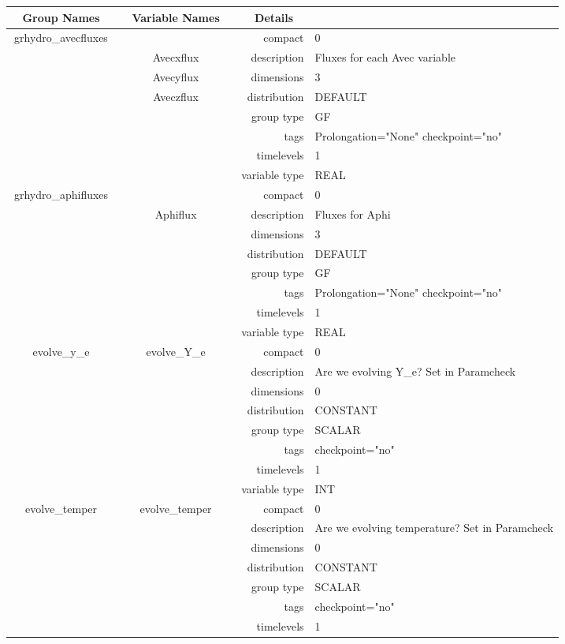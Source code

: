 \begin{tabular*}{150mm}{|c|c@{\extracolsep{\fill}}|rl|} \hline 
~ {\bf Group Names} ~ & ~ {\bf Variable Names} ~  &{\bf Details} ~ & ~ \\ 
\hline 
grhydro\_avecfluxes &  & compact & 0 \\ 
 & Avecxflux & description & Fluxes for each Avec variable \\ 
 & Avecyflux & dimensions & 3 \\ 
 & Aveczflux & distribution & DEFAULT \\ 
 &  & group type & GF \\ 
 &  & tags & Prolongation="None" checkpoint="no" \\ 
 &  & timelevels & 1 \\ 
 &  & variable type & REAL \\ 
\hline 
grhydro\_aphifluxes &  & compact & 0 \\ 
 & Aphiflux & description & Fluxes for Aphi \\ 
 &  & dimensions & 3 \\ 
 &  & distribution & DEFAULT \\ 
 &  & group type & GF \\ 
 &  & tags & Prolongation="None" checkpoint="no" \\ 
 &  & timelevels & 1 \\ 
 &  & variable type & REAL \\ 
\hline 
evolve\_y\_e & evolve\_Y\_e & compact & 0 \\ 
 &  & description & Are we evolving Y\_e? Set in Paramcheck \\ 
 &  & dimensions & 0 \\ 
 &  & distribution & CONSTANT \\ 
 &  & group type & SCALAR \\ 
 &  & tags & checkpoint="no" \\ 
 &  & timelevels & 1 \\ 
 &  & variable type & INT \\ 
\hline 
evolve\_temper & evolve\_temper & compact & 0 \\ 
 &  & description & Are we evolving temperature? Set in Paramcheck \\ 
 &  & dimensions & 0 \\ 
 &  & distribution & CONSTANT \\ 
 &  & group type & SCALAR \\ 
 &  & tags & checkpoint="no" \\ 
 &  & timelevels & 1 \\ 

\end{tabular*}
